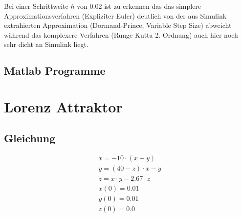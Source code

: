 \documentclass[10pt]{scrartcl}
\begin{document}
	Bei einer Schrittweite $h$ von $0.02$ ist zu erkennen das das simplere Approximationsverfahren (Expliziter Euler) deutlich von der aus Simulink extrahierten Approximation (Dormand-Prince, Variable Step Size) abweicht während das komplexere Verfahren (Runge Kutta 2. Ordnung) auch hier noch sehr dicht an Simulink liegt.
	
	\subsection{Matlab Programme}
	
	
		
		\section{Lorenz Attraktor}
		\subsection{Gleichung}
			\begin{align}
				&\dot{x}=-10 \cdot (x-y)\\
				&\dot{y}=(40-z)\cdot x-y\\
				&\dot{z}=x \cdot y - 2.67 \cdot z\\
				&x(0)=0.01\\
				&y(0)=0.01\\
				&z(0)=0.0
			\end{align}
\end{document}
